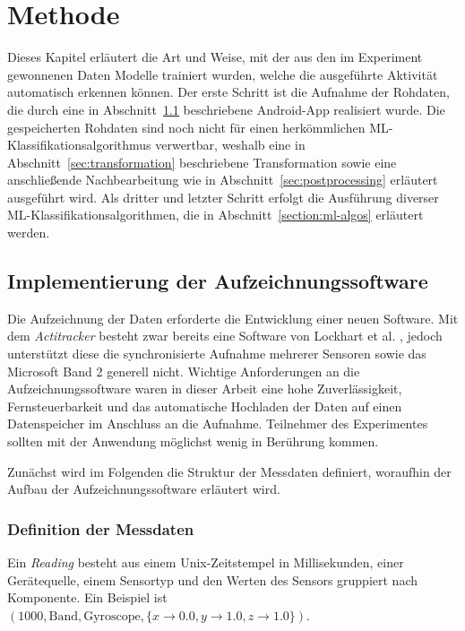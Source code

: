 \chapter{Methode}
\label{chap:method}
Dieses Kapitel erläutert die Art und Weise, mit der aus den im Experiment gewonnenen Daten Modelle trainiert wurden, welche die ausgeführte Aktivität automatisch erkennen können. Der erste Schritt ist die Aufnahme der Rohdaten, die durch eine in Abschnitt~\ref{sec:android-app} beschriebene Android-App realisiert wurde. Die gespeicherten Rohdaten sind noch nicht für einen herkömmlichen ML-Klassifikationsalgorithmus verwertbar, weshalb eine in Abschnitt~\ref{sec:transformation} beschriebene Transformation sowie eine anschließende Nachbearbeitung wie in Abschnitt~\ref{sec:postprocessing} erläutert ausgeführt wird. Als dritter und letzter Schritt erfolgt die Ausführung diverser ML-Klassifikationsalgorithmen, die in Abschnitt~\ref{section:ml-algos} erläutert werden.

\section{Implementierung der Aufzeichnungssoftware}
\label{sec:android-app}
Die Aufzeichnung der Daten erforderte die Entwicklung einer neuen Software. Mit dem \textit{Actitracker} besteht zwar bereits eine Software von Lockhart et al. \cite{Lockhart2014}, jedoch unterstützt diese die synchronisierte Aufnahme mehrerer Sensoren sowie das Microsoft Band 2 generell nicht. Wichtige Anforderungen an die Aufzeichnungssoftware waren in dieser Arbeit eine hohe Zuverlässigkeit, Fernsteuerbarkeit und das automatische Hochladen der Daten auf einen Datenspeicher im Anschluss an die Aufnahme. Teilnehmer des Experimentes sollten mit der Anwendung möglichst wenig in Berührung kommen.

Zunächst wird im Folgenden die Struktur der Messdaten definiert, woraufhin der Aufbau der Aufzeichnungssoftware erläutert wird.

\subsection{Definition der Messdaten}
\begin{definition}
Ein \textit{Reading} besteht aus einem Unix-Zeitstempel in Millisekunden, einer Gerätequelle, einem Sensortyp und den Werten des Sensors gruppiert nach Komponente. Ein Beispiel ist $(1000, \text{Band}, \text{Gyroscope}, \{x \to 0.0, y \to 1.0, z \to 1.0\})$.
\end{definition}

